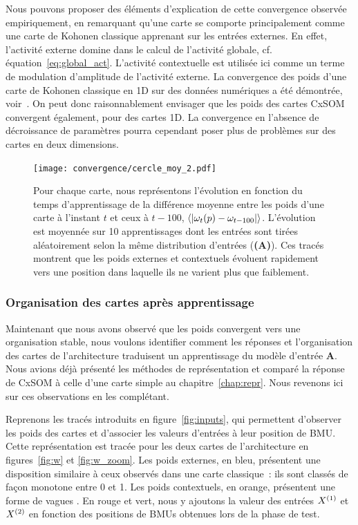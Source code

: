 \documentclass[../main]{subfiles}
\begin{document}
Nous pouvons proposer des éléments d'explication de cette convergence observée empiriquement, en remarquant qu'une carte se comporte principalement comme une carte de Kohonen classique apprenant sur les entrées externes. En effet, l'activité externe domine dans le calcul de l'activité globale, cf. équation~\ref{eq:global_act}.
L'activité contextuelle est utilisée ici comme un terme de modulation d'amplitude de l'activité externe.
La convergence des poids d'une carte de Kohonen classique en 1D sur des données numériques a été démontrée, voir~\cite{cottrell_theoretical_2016}. 
On peut donc raisonnablement envisager que les poids des cartes CxSOM convergent également, pour des cartes 1D.
La convergence en l'absence de décroissance de paramètres pourra cependant poser plus de problèmes sur des cartes en deux dimensions.

\begin{figure}[ht]
	\texttt{[image: convergence/cercle\_moy\_2.pdf]}
	\vspace{-0.5cm}
	\caption{Pour chaque carte, nous représentons l'évolution en fonction du temps d'apprentissage de la différence moyenne entre les poids d'une carte à l'instant $t$ et ceux à $t-100$, $\langle|\omega_t(p) - \omega_{t-100}|\rangle$.
	L'évolution est moyennée sur 10 apprentissages dont les entrées sont tirées aléatoirement selon la même distribution d'entrées (\textbf{(A)}).
	Ces tracés montrent que les poids externes et contextuels évoluent rapidement vers une position dans laquelle ils ne varient plus que faiblement.\label{fig:conv}}
\end{figure}


\subsubsection{Organisation des cartes après apprentissage}

Maintenant que nous avons observé que les poids convergent vers une organisation stable, nous voulons identifier comment les réponses et l'organisation des cartes de l'architecture traduisent un apprentissage du modèle d'entrée \textbf{A}.
Nous avions déjà présenté les méthodes de représentation et comparé la réponse de CxSOM à celle d'une carte simple au chapitre~\ref{chap:repr}.
Nous revenons ici sur ces observations en les complétant.

Reprenons les tracés introduits en figure~\ref{fig:inputs}, qui permettent d'observer les poids des cartes et d'associer les valeurs d'entrées à leur position de BMU.
Cette représentation est tracée pour les deux cartes de l'architecture en figures~\ref{fig:w} et \ref{fig:w_zoom}.
Les poids externes, en bleu, présentent une disposition similaire à ceux observés dans une carte classique~: ils sont classés de façon monotone entre 0 et 1. Les poids contextuels, en orange, présentent une forme de \og vagues \fg{}. En rouge et vert, nous y ajoutons la valeur des entrées $X^{({1})}$ et $X^{({2})}$ en fonction des positions de BMUs obtenues lors de la phase de test.
\end{document}
